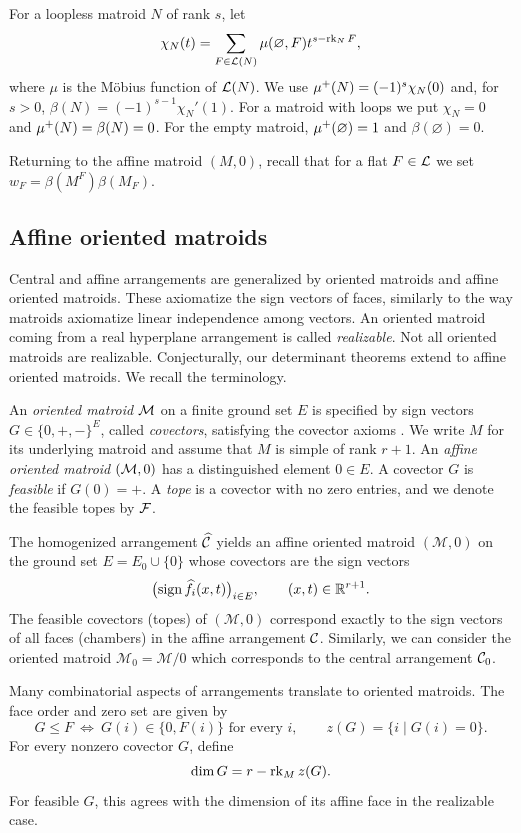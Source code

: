 For a loopless matroid $N$ of rank $s$, let
\[
 \chi_N(t)=\sum_{F\in\mathcal L(N)}\mu(\varnothing,F)t^{s-\operatorname{rk}_N F},
\]
where $\mu$ is the M\"obius function of $\mathcal L(N)$. We use
$\mu^+(N)=(-1)^s\chi_N(0)$ and, for $s>0$,
$\beta(N)=(-1)^{s-1}\chi_N'(1)$. For a matroid with loops we put
$\chi_N=0$ and $\mu^+(N)=\beta(N)=0$. For the empty matroid,
$\mu^+(\varnothing)=1$ and $\beta(\varnothing)=0$.

Returning to the affine matroid $(M,0)$, recall that for a flat $F \in \mathcal L$ we set $w_F=\beta(M^F)\beta(M_F)$.

\subsection{Affine oriented matroids}
Central and affine arrangements are generalized by oriented matroids
and affine oriented matroids. These axiomatize the sign vectors of
faces, similarly to the way matroids axiomatize linear independence
among vectors.
An oriented matroid coming from a real hyperplane arrangement is
called \emph{realizable}. Not all oriented matroids are realizable.
Conjecturally, our determinant theorems extend to affine oriented matroids.
We recall the terminology.

An \emph{oriented matroid} $\mathcal M$ on a finite ground set $E$ is specified
by sign vectors $G\in\{0,+,-\}^E$, called \emph{covectors}, satisfying
the covector axioms \cite{OrientedMatroids1999}.
We write $M$ for its underlying matroid and assume that $M$ is simple
of rank $r+1$. An \emph{affine oriented matroid} $(\mathcal M,0)$ has a
distinguished element $0\in E$. A covector $G$ is \emph{feasible} if
$G(0)=+$. A \emph{tope} is a covector with no zero entries, and we
denote the feasible topes by $\mathcal F$.

The homogenized arrangement $\widehat{\mathcal C}$ yields an affine oriented matroid $(\mathcal{M},0)$ on the ground set $E=E_0\cup\{0\}$ whose covectors are the sign vectors
\[
 \bigl(\operatorname{sign}\widehat f_i(x,t)\bigr)_{i\in E},
 \qquad (x,t)\in\mathbb R^{r+1}.
\]
The feasible covectors (topes) of $(\mathcal{M},0)$ correspond exactly to the sign vectors of all faces (chambers) in the affine arrangement $\mathcal C$.
Similarly, we can consider the oriented matroid $\mathcal M_0=\mathcal{M}/0$ which corresponds to the central arrangement $\mathcal C_0$.

Many combinatorial aspects of arrangements translate to oriented matroids.
The face order and zero set are given by
\[
 G\leq F\ \Longleftrightarrow\ G(i)\in\{0,F(i)\}\text{ for every }i,
 \qquad z(G)=\{i\mid G(i)=0\}.
\]
For every nonzero covector $G$, define
\[
 \dim G=r-\operatorname{rk}_M z(G).
\]
For feasible $G$, this agrees with the dimension of its affine face
in the realizable case. 

